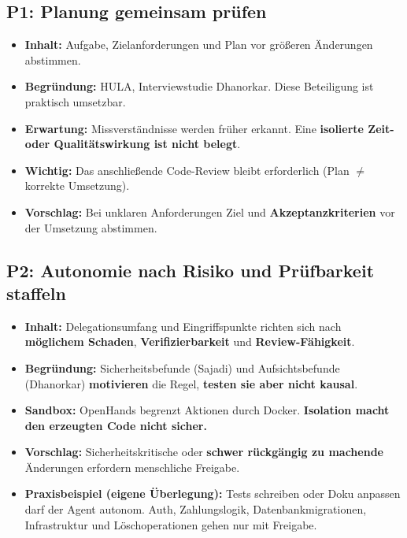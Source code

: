 \documentclass[12pt,a4paper]{article}
\begin{document}
\subsection*{P1: Planung gemeinsam prüfen}
\begin{itemize}
  \item \textbf{Inhalt:} Aufgabe, Zielanforderungen und Plan vor größeren Änderungen abstimmen.
  \item \textbf{Begründung:} HULA, Interviewstudie Dhanorkar. Diese Beteiligung ist praktisch umsetzbar.
  \item \textbf{Erwartung:} Missverständnisse werden früher erkannt. Eine \textbf{isolierte Zeit- oder Qualitätswirkung ist nicht belegt}.
  \item \textbf{Wichtig:} Das anschließende Code-Review bleibt erforderlich (Plan $\neq$ korrekte Umsetzung).
  \item \textbf{Vorschlag:} Bei unklaren Anforderungen Ziel und \textbf{Akzeptanzkriterien} vor der Umsetzung abstimmen.
\end{itemize}

\subsection*{P2: Autonomie nach Risiko und Prüfbarkeit staffeln}
\begin{itemize}
  \item \textbf{Inhalt:} Delegationsumfang und Eingriffspunkte richten sich nach \textbf{möglichem Schaden}, \textbf{Verifizierbarkeit} und \textbf{Review-Fähigkeit}.
  \item \textbf{Begründung:} Sicherheitsbefunde (Sajadi) und Aufsichtsbefunde (Dhanorkar) \textbf{motivieren} die Regel, \textbf{testen sie aber nicht kausal}.
  \item \textbf{Sandbox:} OpenHands begrenzt Aktionen durch Docker. \textbf{Isolation macht den erzeugten Code nicht sicher.}
  \item \textbf{Vorschlag:} Sicherheitskritische oder \textbf{schwer rückgängig zu machende} Änderungen erfordern menschliche Freigabe.
  \item \textbf{Praxisbeispiel (eigene Überlegung):} Tests schreiben oder Doku anpassen darf der Agent autonom. Auth, Zahlungslogik, Datenbankmigrationen, Infrastruktur und Löschoperationen gehen nur mit Freigabe.
\end{itemize}
\end{document}
